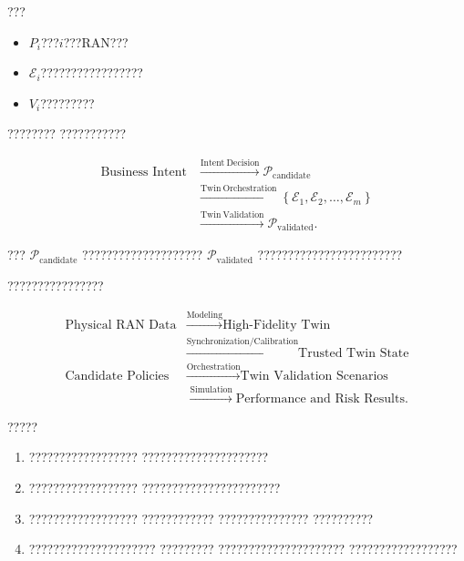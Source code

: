 ???

\begin{itemize}
    \item $P_i$???$i$???RAN???
    \item $\mathcal{E}_i$?????????????????
    \item $V_i$?????????
\end{itemize}

????????
???????????

\begin{equation}
\begin{aligned}
\text{Business Intent}
&\xrightarrow{\mathrm{Intent\ Decision}}
\mathcal{P}_{\mathrm{candidate}}
\\
&\xrightarrow{\mathrm{Twin\ Orchestration}}
\left\{
\mathcal{E}_1,
\mathcal{E}_2,
\ldots,
\mathcal{E}_m
\right\}
\\
&\xrightarrow{\mathrm{Twin\ Validation}}
\mathcal{P}_{\mathrm{validated}}.
\end{aligned}
\label{eq:intent_to_twin_validation_flow}
\end{equation}

???
$\mathcal{P}_{\mathrm{candidate}}$
????????????????????
$\mathcal{P}_{\mathrm{validated}}$
????????????????????????

????????????????

\begin{equation}
\begin{aligned}
\text{Physical RAN Data}
&\xrightarrow{\mathrm{Modeling}}
\text{High-Fidelity Twin}
\\
&\xrightarrow{\mathrm{Synchronization/Calibration}}
\text{Trusted Twin State}
\\
\text{Candidate Policies}
&\xrightarrow{\mathrm{Orchestration}}
\text{Twin Validation Scenarios}
\\
&\xrightarrow{\mathrm{Simulation}}
\text{Performance and Risk Results}.
\end{aligned}
\label{eq:chapter_four_overall_flow}
\end{equation}

?????

\begin{enumerate}[label=\arabic*)]
    \item ??????????????????
    ?????????????????????
    \item ??????????????????
    ???????????????????????
    \item ??????????????????
    ????????????
    ???????????????
    ??????????
    \item ?????????????????????
    ?????????
    ?????????????????????
    ??????????????????
\end{enumerate}

